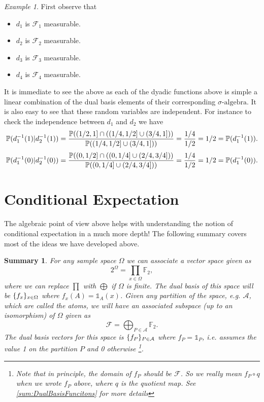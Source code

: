\documentclass[11pt,a4paper]{article}
\newtheorem{summary}{Summary}
\theoremstyle{definition}
\theoremstyle{remark}
\newtheorem{example}{Example}
\begin{document}
\begin{example}
		First observe that
		\begin{itemize}[noitemsep]
			\item $ d_1 $ is $ \mathcal{F}_1 $ measurable.
			\item $ d_2 $ is $ \mathcal{F}_2 $ measurable.
			\item $ d_3 $ is $ \mathcal{F}_3 $ measurable.
			\item $ d_4 $ is $ \mathcal{F}_4 $ measurable.
		\end{itemize}
		It is immediate to see the above as each of the dyadic functions above is simple a linear combination of the dual basis elements of their corresponding $\sigma\text{-algebra}$. It is also easy to see that these random variables are independent. For instance to check the independence between $ d_1 $ and $ d_2 $ we have
		\[ \mathbb{P}(d_1^{-1}(1)|d_2^{-1}(1)) = \frac{\mathbb{P}((1/2,1] \cap ((1/4,1/2]\cup(3/4,1]))}{\mathbb{P}((1/4,1/2]\cup(3/4,1]))} = \frac{1/4}{1/2} = 1/2 =  \mathbb{P}(d^{-1}_1(1)). \]
		\[ \mathbb{P}(d_1^{-1}(0)|d_2^{-1}(0)) = \frac{\mathbb{P}((0,1/2] \cap ((0,1/4]\cup(2/4,3/4]))}{\mathbb{P}((0,1/4]\cup(2/4,3/4]))} = \frac{1/4}{1/2} = 1/2 =  \mathbb{P}(d^{-1}_1(0)). \]
	\end{example}
	
	
	\section{Conditional Expectation}
	The algebraic point of view above helps with understanding the notion of conditional expectation in a much more depth! The following summary covers most of the ideas we have developed above.
	
	\begin{summary}
		For any sample space $ \Omega $ we can associate a vector space given as
		\[ 2^\Omega = \prod_{x\in \Omega} \mathbb{F}_2, \]
		where we can replace $ \prod $ with $ \bigoplus $ if $ \Omega $ is finite. The dual basis of this space will be $ \{f_x\}_{x\in\Omega} $ where $ f_x(A) = \mathds{1}_A(x) $. Given any partition of the space, e.g. $ \mathcal{A} $, which are called the atoms, we will have an associated subspace (up to an isomorphism) of $ \Omega $ given as
		\[ \mathcal{F} = \bigoplus_{P\in\mathcal{A}} \mathbb{F}_2. \]
		The dual basis vectors for this space is $ \{f_{P}\}_{P\in\mathcal{A}} $ where $ f_{P} = \mathds{1}_P $, i.e. assumes the value 1 on the partition $ P $ and 0 otherwise \footnote{Note that in principle, the domain of $ f_P $ should be $ \mathcal{F} $. So we really mean $ f_P\circ q $ when we wrote $ f_P $ above, where $ q $ is the quotient map. See \autoref{sum:DualBasisFuncitons} for more details}. 
	\end{summary}
	
\end{document}
